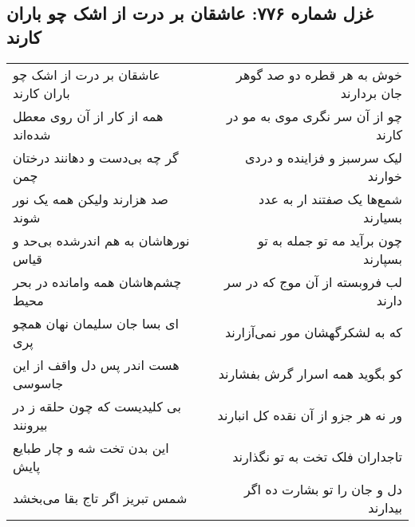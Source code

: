 \begin{center}
\section*{غزل شماره ۷۷۶: عاشقان بر درت از اشک چو باران کارند}
\label{sec:0776}
\begin{longtable}{l p{0.5cm} r}
عاشقان بر درت از اشک چو باران کارند
&&
خوش به هر قطره دو صد گوهر جان بردارند
\\
همه از کار از آن روی معطل شده‌اند
&&
چو از آن سر نگری موی به مو در کارند
\\
گر چه بی‌دست و دهانند درختان چمن
&&
لیک سرسبز و فزاینده و دردی خوارند
\\
صد هزارند ولیکن همه یک نور شوند
&&
شمع‌ها یک صفتند ار به عدد بسیارند
\\
نورهاشان به هم اندرشده بی‌حد و قیاس
&&
چون برآید مه تو جمله به تو بسپارند
\\
چشم‌هاشان همه وامانده در بحر محیط
&&
لب فروبسته از آن موج که در سر دارند
\\
ای بسا جان سلیمان نهان همچو پری
&&
که به لشکرگهشان مور نمی‌آزارند
\\
هست اندر پس دل واقف از این جاسوسی
&&
کو بگوید همه اسرار گرش بفشارند
\\
بی کلیدیست که چون حلقه ز در بیرونند
&&
ور نه هر جزو از آن نقده کل انبارند
\\
این بدن تخت شه و چار طبایع پایش
&&
تاجداران فلک تخت به تو نگذارند
\\
شمس تبریز اگر تاج بقا می‌بخشد
&&
دل و جان را تو بشارت ده اگر بیدارند
\\
\end{longtable}
\end{center}
